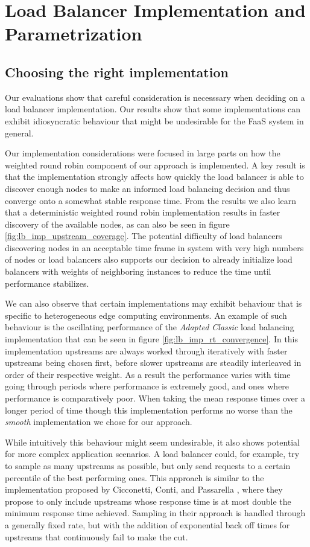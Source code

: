 \section{Load Balancer Implementation and Parametrization}
\subsection{Choosing the right implementation}
Our evaluations show that careful consideration is necesssary when deciding on a load balancer implementation.
Our results show that some implementations can exhibit idiosyncratic behaviour that might be undesirable for the FaaS system in general.

Our implementation considerations were focused in large parts on how the weighted round robin component of our approach is implemented.
A key result is that the implementation strongly affects how quickly the load balancer is able to discover enough nodes to make an informed load balancing decision and thus converge onto a somewhat stable response time.
From the results we also learn that a deterministic weighted round robin implementation results in faster discovery of the available nodes, as can also be seen in figure \ref{fig:lb_imp_upstream_coverage}.
The potential difficulty of load balancers discovering nodes in an acceptable time frame in system with very high numbers of nodes or load balancers also supports our decision to already initialize load balancers with weights of neighboring instances to reduce the time until performance stabilizes.

We can also observe that certain implementations may exhibit behaviour that is specific to heterogeneous edge computing environments.
An example of such behaviour is the oscillating performance of the \textit{Adapted Classic} load balancing implementation that can be seen in figure \ref{fig:lb_imp_rt_convergence}.
In this implementation upstreams are always worked through iteratively with faster upstreams being chosen first, before slower upstreams are steadily interleaved in order of their respective weight.
As a result the performance varies with time going through periods where performance is extremely  good, and ones where performance is comparatively poor.
When taking the mean response times over a longer period of time though this implementation performs no worse than the \textit{smooth} implementation we chose for our approach.

While intuitively this behaviour might seem undesirable, it also shows potential for more complex application scenarios.
A load balancer could, for example, try to sample as many upstreams as possible, but only send requests to a certain percentile of the best performing ones.
This approach is similar to the implementation proposed by Cicconetti, Conti, and Passarella \cite{cicconettiDecentralizedFrameworkServerless2020}, where they propose to only include upstreams whose response time is at most double the minimum response time achieved.
Sampling in their approach is handled through a generally fixed rate, but with the addition of exponential back off times for upstreams that continuously fail to make the cut.


